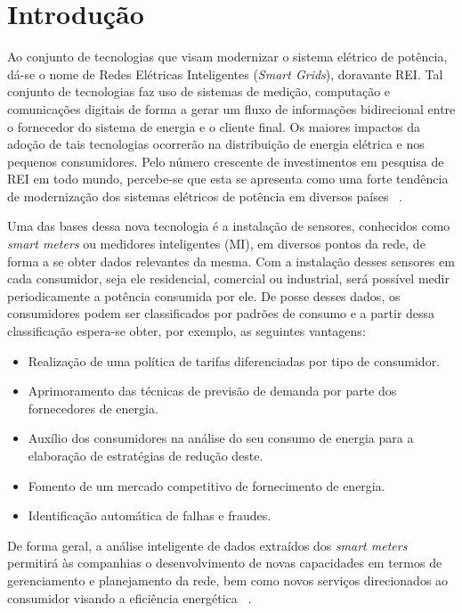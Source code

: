 \chapter{Introdução}
Ao conjunto de tecnologias que visam modernizar o sistema elétrico de potência, dá-se o nome de Redes Elétricas Inteligentes (\emph{Smart Grids}), doravante REI. Tal conjunto de tecnologias faz uso de sistemas de medição, computação e comunicações digitais de forma a gerar um fluxo de informações bidirecional entre o fornecedor do sistema de energia e o cliente final. Os maiores impactos da adoção de tais tecnologias ocorrerão na distribuição de energia elétrica e nos pequenos consumidores. Pelo número crescente de investimentos em pesquisa de REI em todo mundo, percebe-se que esta se apresenta como uma forte tendência de modernização dos sistemas elétricos de potência em diversos países ~\parencite{REI}.

Uma das bases dessa nova tecnologia é a instalação de sensores, conhecidos como \emph{smart meters} ou medidores inteligentes (MI),  em diversos pontos da rede, de forma a se obter dados relevantes da mesma. Com a instalação desses sensores em cada consumidor, seja ele residencial, comercial ou industrial, será possível medir periodicamente a potência consumida por ele. De posse desses dados, os consumidores podem ser classificados por padrões de consumo e a partir dessa classificação espera-se obter, por exemplo, as seguintes vantagens:
\begin{itemize}
	\item Realização de uma política de tarifas diferenciadas por tipo de consumidor.
	\item Aprimoramento das técnicas de previsão de demanda por parte dos fornecedores
	de energia.
	\item Auxílio dos consumidores na análise do seu consumo de energia para a elaboração
	de estratégias de redução deste.
	\item Fomento de um mercado competitivo de fornecimento de energia.
	\item Identificação automática de falhas e fraudes.
\end{itemize}

De forma geral, a análise inteligente de dados extraídos dos \emph{smart meters} permitirá
às companhias o desenvolvimento de novas capacidades em termos de gerenciamento e
planejamento da rede, bem como novos serviços direcionados ao consumidor visando a
eficiência energética ~\parencite{ReviewElectric}.

